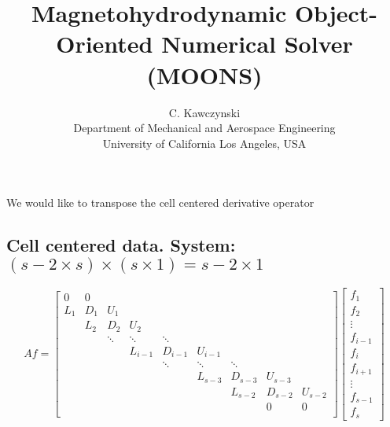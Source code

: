 \documentclass[11pt]{article}
\begin{document}
\doublespacing
\title{Magnetohydrodynamic Object-Oriented Numerical Solver (MOONS)}
\author{C. Kawczynski \\
Department of Mechanical and Aerospace Engineering \\
University of California Los Angeles, USA\\
}

We would like to transpose the cell centered derivative operator

\subsection{Cell centered data. System:
\texorpdfstring{$ (s-2 \times s) \times (s \times 1) = s-2 \times 1$}{}}

\[ Af = \left[
\begin{array}{ccccccccc}
0 & 0    &       &           &           &           &       &         & \\
L_{1} & D_{1}    & U_{1}     &           &           &           &       &         & \\
      & L_{2} & D_{2}    & U_{2}     &           &           &           &         & \\
      &       & \ddots   & \ddots    & \ddots    &           &           &         & \\
      &       &          & L_{i-1}   & D_{i-1}   & U_{i-1}   &           &         & \\
      &       &          &           & \ddots    & \ddots    & \ddots    &         & \\
      &       &          &           &           & L_{s-3}   & D_{s-3}   & U_{s-3} & \\
      &      &       &          &           &           & L_{s-2}   & D_{s-2}   & U_{s-2} \\
  &      &       &           &           &           &       &      0  & 0 \\
\end{array} \right] 
\left[ \begin{array}{c}
f_{1} \\ f_{2} \\ \vdots \\ f_{i-1} \\ f_{i} \\ f_{i+1} \\ \vdots \\ f_{s-1} \\ f_{s}
\end{array} \right]
\]
\end{document}
